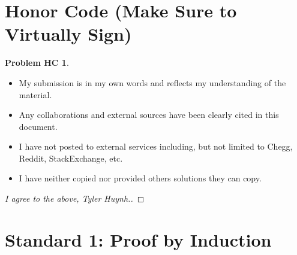 \documentclass[11pt]{article}
\theoremstyle{definition}
\theoremstyle{definition}
\newtheorem*{requiredHC}{Problem HC}
\theoremstyle{definition}
\begin{document}
\section*{Honor Code (Make Sure to Virtually Sign)} \label{HonorCode}

\begin{requiredHC}
\begin{itemize}
\item My submission is in my own words and reflects my understanding of the material.
\item Any collaborations and external sources have been clearly cited in this document.
\item I have not posted to external services including, but not limited to Chegg, Reddit, StackExchange, etc.
\item I have neither copied nor provided others solutions they can copy.
\end{itemize}

\end{requiredHC}

\begin{proof}[I agree to the above, Tyler Huynh.]
\end{proof}


\newpage
\section{Standard 1: Proof by Induction}
\end{document}
